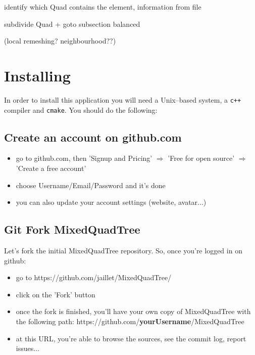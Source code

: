 \documentclass[10pt]{article}
\begin{document}
identify which Quad contains the element, information from file

subdivide Quad + goto subsection balanced

(local remeshing? neighbourhood??)


\section{Installing}
\label{install}

In order to install this application you will need a Unix--based system, a \texttt{c++} compiler and \texttt{cmake}. You should do the following:

\subsection{Create an account on github.com}

\begin{itemize}
\item go to github.com, then 'Signup and Pricing' $\Rightarrow$ 'Free for open source' $\Rightarrow$ 'Create a free account'
\item choose Username/Email/Password and it's done
\item you can also update your account settings (website, avatar...)
\end {itemize}

\subsection{Git Fork MixedQuadTree}

Let's fork the initial MixedQuadTree repository. So, once you're logged in on github:
\begin{itemize}
\item go to https://github.com/jaillet/MixedQuadTree/
\item click on the 'Fork' button
\item once the fork is finished, you'll have your own copy of MixedQuadTree with the following path: https://github.com/\textbf{yourUsername}/MixedQuadTree
\item at this URL, you're able to browse the sources, see the commit log, report issues...
\end {itemize}

\end{document}
